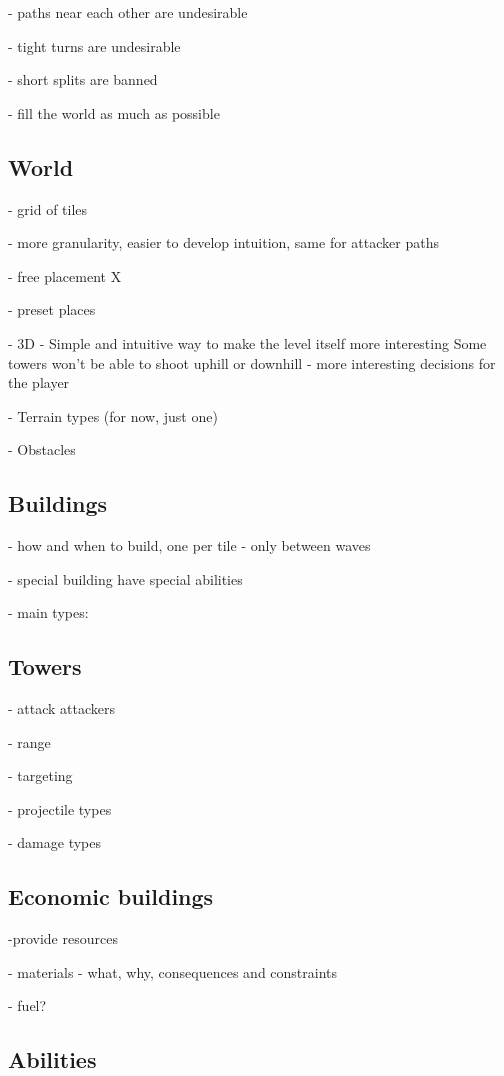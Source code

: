 - paths near each other are undesirable

- tight turns are undesirable

- short splits are banned

- fill the world as much as possible

\subsection{World}

- grid of tiles \checkmark

- more granularity, easier to develop intuition, same for attacker paths

- free placement X

- preset places

- 3D \checkmark
- Simple and intuitive way to make the level itself more interesting
Some towers won't be able to shoot uphill or downhill - more interesting decisions for the player

- Terrain types (for now, just one)

- Obstacles

\subsection{Buildings}

- how and when to build, one per tile
- only between waves

- special building have special abilities

- main types:


\subsection{Towers}

- attack attackers

- range

- targeting

- projectile types

- damage types

\subsection{Economic buildings}

-provide resources

- materials - what, why, consequences and constraints

- fuel?

\subsection{Abilities}

